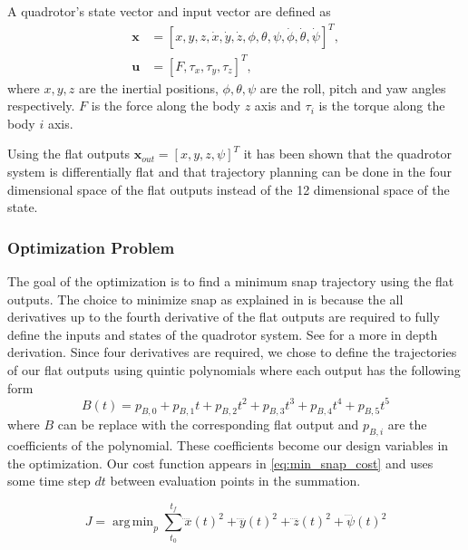 \documentclass[letterpaper,conference, 10pt]{ieeeconf}
\DeclareMathOperator*{\argmin}{arg\,min}
\begin{document}
A quadrotor's state vector and input vector are defined as
\begin{align*}
    \boldsymbol{x}&=[x,y,z,\dot{x},\dot{y},\dot{z},\phi,\theta,\psi,\dot{\phi},\dot{\theta},\dot{\psi}]^T,\\
    \boldsymbol{u}&=[F, \tau_x, \tau_y, \tau_z]^T,
\end{align*}
where $x, y, z$ are the inertial positions, $\phi, \theta, \psi$ are the roll, pitch and yaw angles respectively. $F$ is the force along the body $z$ axis and $\tau_i$ is the torque along the body $i$ axis.

Using the flat outputs $\boldsymbol{x}_{out}=[x, y, z, \psi]^T$ it has been shown \cite{mellinger2011minimum} that the quadrotor system is differentially flat and that trajectory planning can be done in the four dimensional space of the flat outputs instead of the 12 dimensional space of the state.

\subsubsection{Optimization Problem}
\label{subsection:opt_prob}

The goal of the optimization is to find a minimum snap trajectory using the flat outputs. The choice to minimize snap as explained in \cite{mellinger2011minimum} is because the all derivatives up to the fourth derivative of the flat outputs are required to fully define the inputs and states of the quadrotor system. See \cite{mellinger2011minimum} for a more in depth derivation. Since four derivatives are required, we chose to define the trajectories of our flat outputs using quintic polynomials where each output has the following form 
\begin{equation*}
    B(t) = p_{B,0} + p_{B,1}t + p_{B,2}t^2 + p_{B,3}t^3 + p_{B,4}t^4 + p_{B,5}t^5
\end{equation*}
where $B$ can be replace with the corresponding flat output and $p_{B,i}$ are the coefficients of the polynomial. These coefficients become our design variables in the optimization. Our cost function appears in \cref{eq:min_snap_cost} and uses some time step $dt$ between evaluation points in the summation.

\begin{equation}
    J = \argmin_p \sum_{t_0}^{t_f} \ddddot{x}(t)^2 + \ddddot{y}(t)^2 + \ddddot{z}(t)^2 + \ddddot{\psi}(t)^2
    \label{eq:min_snap_cost}
\end{equation}
\end{document}
